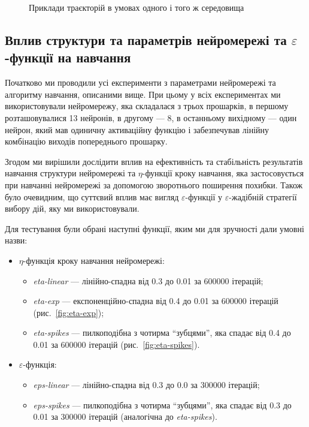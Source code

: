 \documentclass[a4paper,10pt,fleqn]{article}
\begin{document}
\begin{figure}
  \caption{Приклади траєкторій в умовах одного і того ж середовища}
  \label{fig:learning-samples}
\end{figure}

\subsection{Вплив структури та параметрів нейромережі та $\varepsilon$-функції на навчання}

Початково ми проводили усі експерименти з параметрами нейромережі та алгоритму навчання, описаними вище. При цьому у всіх експериментах ми використовували нейромережу, яка складалася з трьох прошарків, в першому розташовувалися 13 нейронів, в другому --- 8, в останньому вихідному --- один нейрон, який мав одиничну активаційну функцію і забезпечував лінійну комбінацію виходів попереднього прошарку. 

Згодом ми вирішили дослідити вплив на ефективність та стабільність результатів навчання структури нейромережі та $\eta$-функції кроку навчання, яка застосовується при навчанні нейромережі за допомогою зворотнього поширення похибки. Також було очевидним, що суттєвий вплив має вигляд $\varepsilon$-функції у $\varepsilon$-жадібній стратегії вибору дій, яку ми використовували. 

Для тестування були обрані наступні функції, яким ми для зручності дали умовні назви:
\begin{itemize}
\item $\eta$-функція кроку навчання нейромережі:
	\begin{itemize}
	\item \textit{eta-linear} --- лінійно-спадна від 0.3 до 0.01 за 600000 ітерацій;
	\item \textit{eta-exp} --- експоненційно-спадна від 0.4 до 0.01 за 600000 ітерацій  (рис.~\ref{fig:eta-exp});
	\item \textit{eta-spikes} --- пилкоподібна з чотирма ``зубцями'', яка спадає від 0.4 до 0.01 за 600000 ітерацій  (рис.~\ref{fig:eta-spikes}).
	\end{itemize}
\item $\varepsilon$-функція:
	\begin{itemize}
	\item \textit{eps-linear} --- лінійно-спадна від 0.3 до 0.0 за 300000 ітерацій;
	\item \textit{eps-spikes} --- пилкоподібна з чотирма ``зубцями'', яка спадає від 0.3 до 0.01 за 300000 ітерацій (аналогічна до \textit{eta-spikes}).
	\end{itemize}
\end{itemize}
\end{document}
